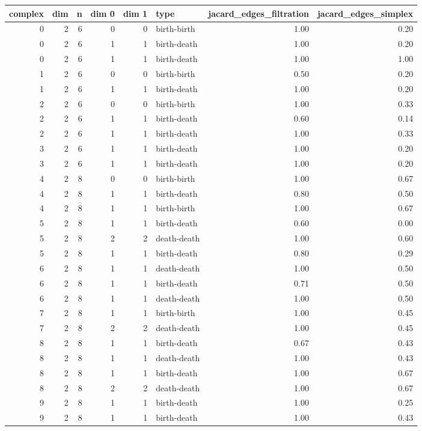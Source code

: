 \documentclass{article}
\begin{document}
\begin{center}
\begin{tabular}{rrrrrlrr}
\toprule
complex & dim & n & dim 0 & dim 1 & type & jacard\_edges\_filtration & jacard\_edges\_simplex \\
\midrule
0 & 2 & 6 & 0 & 0 & birth-birth & 1.00 & 0.20 \\
0 & 2 & 6 & 1 & 1 & birth-death & 1.00 & 0.20 \\
0 & 2 & 6 & 1 & 1 & birth-death & 1.00 & 1.00 \\
1 & 2 & 6 & 0 & 0 & birth-birth & 0.50 & 0.20 \\
1 & 2 & 6 & 1 & 1 & birth-death & 1.00 & 0.20 \\
2 & 2 & 6 & 0 & 0 & birth-birth & 1.00 & 0.33 \\
2 & 2 & 6 & 1 & 1 & birth-death & 0.60 & 0.14 \\
2 & 2 & 6 & 1 & 1 & birth-death & 1.00 & 0.33 \\
3 & 2 & 6 & 1 & 1 & birth-death & 1.00 & 0.20 \\
3 & 2 & 6 & 1 & 1 & birth-death & 1.00 & 0.20 \\
4 & 2 & 8 & 0 & 0 & birth-birth & 1.00 & 0.67 \\
4 & 2 & 8 & 1 & 1 & birth-death & 0.80 & 0.50 \\
4 & 2 & 8 & 1 & 1 & birth-birth & 1.00 & 0.67 \\
5 & 2 & 8 & 1 & 1 & birth-death & 0.60 & 0.00 \\
5 & 2 & 8 & 2 & 2 & death-death & 1.00 & 0.60 \\
5 & 2 & 8 & 1 & 1 & birth-death & 0.80 & 0.29 \\
6 & 2 & 8 & 1 & 1 & death-death & 1.00 & 0.50 \\
6 & 2 & 8 & 1 & 1 & birth-death & 0.71 & 0.50 \\
6 & 2 & 8 & 1 & 1 & death-death & 1.00 & 0.50 \\
7 & 2 & 8 & 1 & 1 & birth-birth & 1.00 & 0.45 \\
7 & 2 & 8 & 2 & 2 & death-death & 1.00 & 0.45 \\
8 & 2 & 8 & 1 & 1 & birth-death & 0.67 & 0.43 \\
8 & 2 & 8 & 1 & 1 & death-death & 1.00 & 0.43 \\
8 & 2 & 8 & 1 & 1 & birth-death & 1.00 & 0.67 \\
8 & 2 & 8 & 2 & 2 & death-death & 1.00 & 0.67 \\
9 & 2 & 8 & 1 & 1 & birth-death & 1.00 & 0.25 \\
9 & 2 & 8 & 1 & 1 & birth-death & 1.00 & 0.43 \\

\end{tabular}
\end{center}
\end{document}
